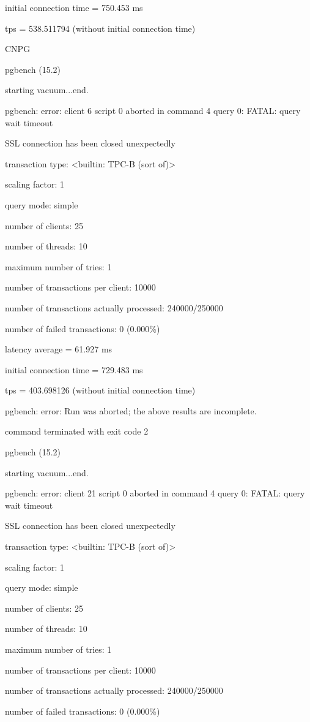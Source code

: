 initial connection time = 750.453 ms

tps = 538.511794 (without initial connection time)

CNPG

pgbench (15.2)

starting vacuum...end.

pgbench: error: client 6 script 0 aborted in command 4 query 0: FATAL:  query wait timeout

SSL connection has been closed unexpectedly

transaction type: <builtin: TPC-B (sort of)>

scaling factor: 1

query mode: simple

number of clients: 25

number of threads: 10

maximum number of tries: 1

number of transactions per client: 10000

number of transactions actually processed: 240000/250000

number of failed transactions: 0 (0.000\%)

latency average = 61.927 ms

initial connection time = 729.483 ms

tps = 403.698126 (without initial connection time)

pgbench: error: Run was aborted; the above results are incomplete.

command terminated with exit code 2

pgbench (15.2)

starting vacuum...end.

pgbench: error: client 21 script 0 aborted in command 4 query 0: FATAL:  query wait timeout

SSL connection has been closed unexpectedly

transaction type: <builtin: TPC-B (sort of)>

scaling factor: 1

query mode: simple

number of clients: 25

number of threads: 10

maximum number of tries: 1

number of transactions per client: 10000

number of transactions actually processed: 240000/250000

number of failed transactions: 0 (0.000\%)

